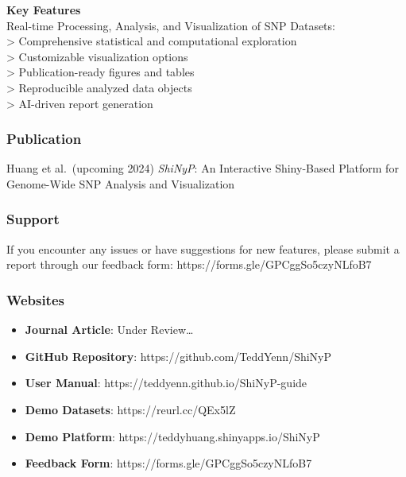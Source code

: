 \documentclass[
]{book}
\begin{document}
\textbf{Key Features}\\
Real-time Processing, Analysis, and Visualization of SNP Datasets:\\
\textgreater{} Comprehensive statistical and computational exploration\\
\textgreater{} Customizable visualization options\\
\textgreater{} Publication-ready figures and tables\\
\textgreater{} Reproducible analyzed data objects\\
\textgreater{} AI-driven report generation

\subsubsection*{Publication}\label{publication}

Huang et al.~(upcoming 2024) \emph{ShiNyP}: An Interactive Shiny-Based Platform for Genome-Wide SNP Analysis and Visualization

\subsubsection*{Support}\label{support}

If you encounter any issues or have suggestions for new features, please submit a report through our feedback form: https://forms.gle/GPCggSo5czyNLfoB7

\subsubsection*{Websites}\label{websites}

\begin{itemize}
\item
  \textbf{Journal Article}: Under Review\ldots{}
\item
  \textbf{GitHub Repository}: https://github.com/TeddYenn/ShiNyP
\item
  \textbf{User Manual}: https://teddyenn.github.io/ShiNyP-guide
\item
  \textbf{Demo Datasets}: https://reurl.cc/QEx5lZ
\item
  \textbf{Demo Platform}: https://teddyhuang.shinyapps.io/ShiNyP
\item
  \textbf{Feedback Form}: https://forms.gle/GPCggSo5czyNLfoB7
\end{itemize}
\end{document}
